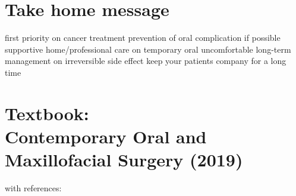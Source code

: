 \documentclass[
paper=landscape,
paper=160mm:90mm, %
fontsize=11pt, %
pagesize, %
parskip=half-, %
]{scrartcl} %
\theoremstyle{mythmstyle} %
\begin{document}





\clearpage


\section{Take home message}
\begin{outline}
    \1 first priority on cancer treatment
    \1 prevention of oral complication if possible
    \1 supportive home/professional care on temporary oral uncomfortable
    \1 long-term management on irreversible side effect
    \1 keep your patients company for a long time
\end{outline}

\clearpage
\section*{Textbook: \\
Contemporary Oral and Maxillofacial Surgery (2019)
}
with references:
\autocite{Harris2022, Kawashita2020, Migliorati2022}

\printbibliography[title={Whole bibliography}]
\thispagestyle{headings} %
%
%
\end{document}
